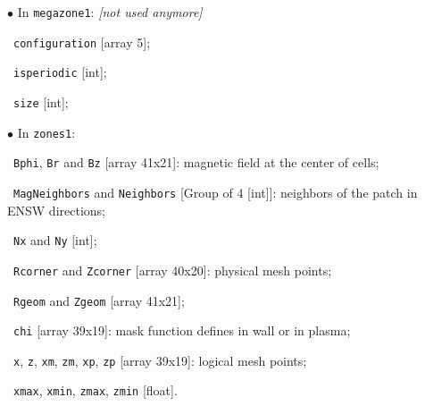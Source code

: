 \documentclass[t,10pt,a3paper]{beamer} %
\begin{document}
\begin{frame}
\begin{columns}
\begin{column}{0.6\textwidth}
	\vspace*{0.15cm}
	{\color{vert} $\bullet$}  In \verb|megazone1|: \textit{[not used anymore]} \par 
	\ \verb|configuration| [array 5]; \par 
	\ \verb|isperiodic| [int]; \par 
	\ \verb|size| [int]; \par 

	\vspace*{0.15cm}

	{\color{vert} $\bullet$}  In \verb|zones1|: \par
	\ \verb|Bphi|, \verb|Br| and \verb|Bz| [array 41x21]: magnetic field at the center of cells; \par 
	\ \verb|MagNeighbors| and \verb|Neighbors| [Group of 4 [int]]: neighbors of the patch in ENSW directions; \par 
	\ \verb|Nx| and \verb|Ny| [int]; \par 
	\ \verb|Rcorner| and \verb|Zcorner| [array 40x20]: physical mesh points; \par 
	\ \verb|Rgeom| and \verb|Zgeom| [array 41x21]; \par 
	\ \verb|chi| [array 39x19]: mask function defines in wall or in plasma; \par 
	\ \verb|x|, \verb|z|, \verb|xm|, \verb|zm|, \verb|xp|, \verb|zp| [array 39x19]: logical mesh points; \par 
	\ \verb|xmax|, \verb|xmin|, \verb|zmax|, \verb|zmin| [float]. \par
	\end{column}
	\end{columns}


\end{frame}
\end{document}
